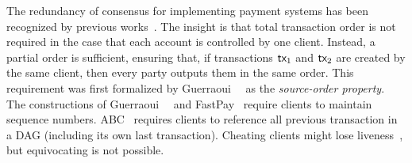 The redundancy of consensus for implementing payment systems has been recognized by previous works~\cite{DBLP:journals/dc/GuerraouiKMPS22,DBLP:journals/corr/abs-1909-10926,DBLP:conf/dsn/CollinsGKKMPPST20,DBLP:conf/aft/BaudetDS20}.
The insight is that total transaction order is not required in the case that each account is controlled by one client.
Instead, a partial order is sufficient, ensuring that, if transactions $\textsf{tx}_1$ and $\textsf{tx}_2$ are created by the same client, then every party outputs them in the same order.
This requirement was first formalized by Guerraoui~\etal~\cite{DBLP:journals/dc/GuerraouiKMPS22} as the \emph{source-order property}.
The constructions of Guerraoui~\etal~\cite{DBLP:journals/dc/GuerraouiKMPS22} and FastPay~\cite{DBLP:conf/aft/BaudetDS20} require clients to maintain sequence numbers.
ABC~\cite{DBLP:journals/corr/abs-1909-10926} requires clients to reference all previous transaction in a DAG (including its own last transaction).
Cheating clients might lose liveness~\cite{DBLP:conf/aft/BaudetDS20,DBLP:journals/dc/GuerraouiKMPS22,DBLP:journals/corr/abs-1909-10926}, but equivocating is not possible.



